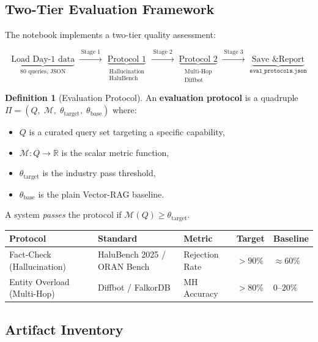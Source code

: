 \documentclass[12pt,a4paper]{article}
\theoremstyle{definition}
\newtheorem{definition}{Definition}[section]
\theoremstyle{plain}
\theoremstyle{remark}
\newcommand{\R}{\mathbb{R}}
\begin{document}
\subsection{Two-Tier Evaluation Framework}

The notebook implements a two-tier quality assessment:

\[
\underbrace{\text{Load Day-1 data}}_{\text{80 queries, JSON}}
\;\xrightarrow{\;\text{Stage 1}\;}\;
\underbrace{\text{Protocol 1}}_{\substack{\text{Hallucination}\\\text{HaluBench}}}
\;\xrightarrow{\;\text{Stage 2}\;}\;
\underbrace{\text{Protocol 2}}_{\substack{\text{Multi-Hop}\\\text{Diffbot}}}
\;\xrightarrow{\;\text{Stage 3}\;}\;
\underbrace{\text{Save \& Report}}_{\texttt{eval\_protocols.json}}
\]

\begin{definition}[Evaluation Protocol]
\label{def:protocol}
An \textbf{evaluation protocol} is a quadruple
$\Pi = (Q,\; \mathcal{M},\; \theta_{\mathrm{target}},\; \theta_{\mathrm{base}})$
where:
\begin{itemize}
  \item $Q$ is a curated query set targeting a specific capability,
  \item $\mathcal{M}: Q \to \R$ is the scalar metric function,
  \item $\theta_{\mathrm{target}}$ is the industry pass threshold,
  \item $\theta_{\mathrm{base}}$ is the plain Vector-RAG baseline.
\end{itemize}
A system \emph{passes} the protocol if $\mathcal{M}(Q) \geq \theta_{\mathrm{target}}$.
\end{definition}

\begin{center}
\renewcommand{\arraystretch}{1.3}
\begin{tabular}{lllll}
\toprule
\textbf{Protocol} & \textbf{Standard} & \textbf{Metric} &
\textbf{Target} & \textbf{Baseline} \\
\midrule
Fact-Check (Hallucination) & HaluBench 2025 / ORAN Bench & Rejection Rate &
$>90\%$ & $\approx60\%$ \\
Entity Overload (Multi-Hop) & Diffbot / FalkorDB & MH Accuracy &
$>80\%$ & $0$--$20\%$ \\
\bottomrule
\end{tabular}
\end{center}

\subsection{Artifact Inventory}
\end{document}
